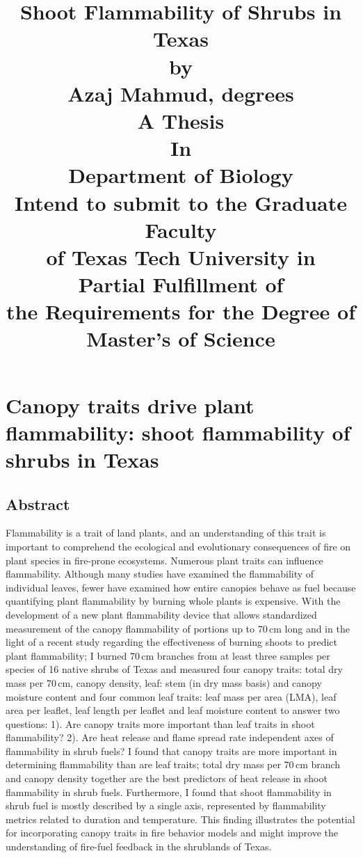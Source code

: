 \documentclass[12pt]{report}
\title{
  Shoot Flammability of Shrubs in Texas\\[15pt]
by\\
Azaj Mahmud, degrees\\
A Thesis\\
In\\
Department of Biology\\
Intend to submit to the Graduate Faculty\\
of Texas Tech University in\\
Partial Fulfillment of\\
the Requirements for the Degree of\\
Master's of Science\\}
\begin{document}
\maketitle
\tableofcontents
\listoftables
\listoffigures
\doublespacing

\chapter{Canopy traits drive plant flammability: shoot flammability of shrubs in Texas}

\section{Abstract}
    
Flammability is a trait of land plants, and an understanding of this trait is important to comprehend the ecological and evolutionary consequences of fire on plant species in fire-prone ecosystems. Numerous plant traits can influence flammability. Although many studies have examined the flammability of individual leaves, fewer have examined how entire canopies behave as fuel because quantifying plant flammability by burning whole plants is expensive. With the development of a new plant flammability device that allows standardized measurement of the canopy flammability of portions up to 70\,cm long and in the light of a recent study regarding the effectiveness of burning shoots to predict plant flammability; I burned 70\,cm branches from at least three samples per species of 16 native shrubs of Texas and measured four canopy traits: total dry mass per 70\,cm, canopy density, leaf: stem (in dry mass basis) and canopy moisture content and four common leaf traits: leaf mass per area (LMA), leaf area per leaflet, leaf length per leaflet and leaf moisture content to answer two questions: 1). Are canopy traits more important than leaf traits in shoot flammability? 2). Are heat release and flame spread rate independent axes of flammability in shrub fuels? I found that canopy traits are more important in determining flammability than are leaf traits; total dry mass per 70\,cm branch and canopy density together are the best predictors of heat release in shoot flammability in shrub fuels. Furthermore, I found that shoot flammability in shrub fuel is mostly described by a single axis, represented by flammability metrics related to duration and temperature. This finding illustrates the potential for incorporating canopy traits in fire behavior models and might improve the understanding of fire-fuel feedback in the shrublands of Texas.
\end{document}
